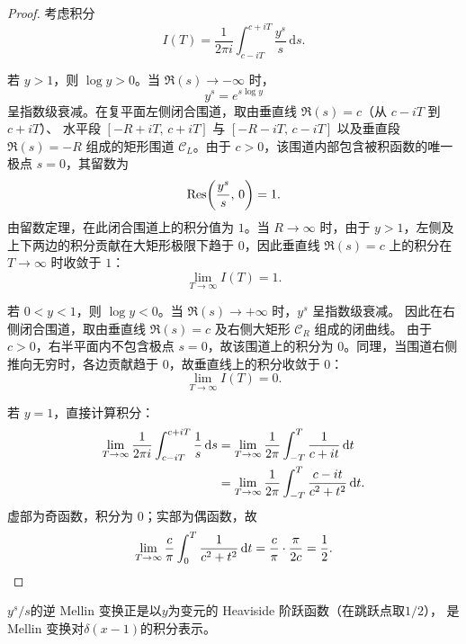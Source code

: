 \begin{proof}
考虑积分
\begin{equation}
  I(T)
  = \frac{1}{2\pi i}
    \int_{c-iT}^{c+iT} \frac{y^s}{s}\,\mathrm{d}s.
\end{equation}

若 $y > 1$，则 $\log y > 0$。当 $\Re(s)\to-\infty$ 时，
\begin{equation}
  y^s = e^{s\log y}
\end{equation}
呈指数级衰减。在复平面左侧闭合围道，取由垂直线 $\Re(s)=c$（从 $c-iT$ 到 $c+iT$）、
水平段 $[-R+iT,\,c+iT]$ 与 $[-R-iT,\,c-iT]$ 以及垂直段 $\Re(s)=-R$ 组成的矩形围道
$\mathcal{C}_L$。由于 $c>0$，该围道内部包含被积函数的唯一极点 $s=0$，其留数为
\begin{equation}
  \operatorname{Res}\!\left(\frac{y^s}{s},\,0\right) = 1.
\end{equation}
由留数定理，在此闭合围道上的积分值为 $1$。当 $R\to\infty$ 时，由于 $y>1$，左侧及上下两边的积分贡献在大矩形极限下趋于 $0$，因此垂直线 $\Re(s)=c$ 上的积分在 $T\to\infty$ 时收敛于 $1$：
\begin{equation}
  \lim_{T\to\infty} I(T) = 1.
\end{equation}

若 $0 < y < 1$，则 $\log y < 0$。当 $\Re(s)\to+\infty$ 时，$y^s$ 呈指数级衰减。
因此在右侧闭合围道，取由垂直线 $\Re(s)=c$ 及右侧大矩形 $\mathcal{C}_R$ 组成的闭曲线。
由于 $c>0$，右半平面内不包含极点 $s=0$，故该围道上的积分为 $0$。同理，当围道右侧推向无穷时，各边贡献趋于 $0$，故垂直线上的积分收敛于 $0$：
\begin{equation}
  \lim_{T\to\infty} I(T) = 0.
\end{equation}

若 $y = 1$，直接计算积分：
\begin{align}
\lim_{T\to\infty} \frac{1}{2\pi i}
  \int_{c-iT}^{c+iT} \frac{1}{s}\,\mathrm{d}s
&= \lim_{T\to\infty} \frac{1}{2\pi}
  \int_{-T}^{T} \frac{1}{c+it}\,\mathrm{d}t
\notag\\
&= \lim_{T\to\infty} \frac{1}{2\pi}
  \int_{-T}^{T} \frac{c-it}{c^2+t^2}\,\mathrm{d}t.
\end{align}
虚部为奇函数，积分为 $0$；实部为偶函数，故
\begin{equation}
\lim_{T\to\infty} \frac{c}{\pi}
  \int_{0}^{T} \frac{1}{c^2+t^2}\,\mathrm{d}t
= \frac{c}{\pi}\cdot\frac{\pi}{2c}
= \frac{1}{2}.
\qedhere
\end{equation}
\end{proof}


$y^s/s$的逆 Mellin 变换正是以$y$为变元的 Heaviside 阶跃函数（在跳跃点取$1/2$），
是 Mellin 变换对$\delta(x-1)$的积分表示。


